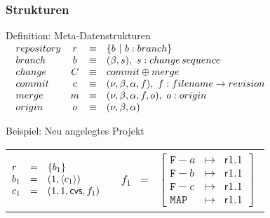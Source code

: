 \documentclass[german]{beamer}
\begin{document}
\begin{frame}
  \frametitle{Strukturen}

  \begin{block}{Definition: Meta-Datenstrukturen}
    \medskip
    $\begin{array}{@{\hspace{1em}}lccl}
      \STRUCT{repository} & r & \equiv & \{b\ |\ b : \STRUCT{branch}\} \\
      \STRUCT{branch}     & b & \equiv &
      (\beta, s),\ s : \STRUCT{change\,sequence} \\
      \STRUCT{change}     & C & \equiv &
      \STRUCT{commit}\oplus\STRUCT{merge} \\
      \STRUCT{commit}     & c & \equiv &
      (\nu, \beta, \alpha, f),\ f : \STRUCT{filename}\to
      \STRUCT{revision} \\
      \STRUCT{merge}      & m & \equiv &
      (\nu, \beta, \alpha, f, o),\ o : \STRUCT{origin} \\
      \STRUCT{origin}     & o & \equiv &
      (\nu, \beta, \alpha)      \end{array}$
  \end{block}

  \begin{block}{Beispiel: Neu angelegtes Projekt}
    \medskip
    \begin{tabular}{@{\hspace{1em}}ll}
      $\begin{array}{@{}lcl}
        r   &=& \{b_1\} \\
        b_1 &=& (1, \langle c_1 \rangle) \\
        c_1 &=& (1, 1, \mathsf{cvs}, f_1)
      \end{array}$ &
      $\begin{array}{lcl}
        f_1 &=& \left[
          \begin{array}{lcl}
            \mathtt{F-}a & \mapsto & \mathsf{r1.1} \\
            \mathtt{F-}b & \mapsto & \mathsf{r1.1} \\
            \mathtt{F-}c & \mapsto & \mathsf{r1.1} \\
            \mathtt{MAP} & \mapsto & \mathsf{r1.1}
          \end{array}
        \right]
      \end{array}$
    \end{tabular}
  \end{block}
\end{frame}
\end{document}
